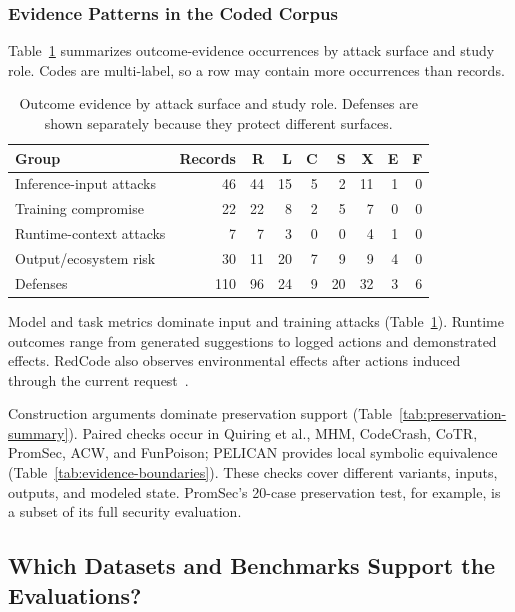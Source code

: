 \documentclass[acmsmall,screen,review,nonacm]{acmart}
\begin{document}
\subsubsection{Evidence Patterns in the Coded Corpus}
Table~\ref{tab:surface-evidence} summarizes outcome-evidence occurrences by attack surface and study role. Codes are multi-label, so a row may contain more occurrences than records.

{\scriptsize
\begin{table}[t]
\centering
\caption{Outcome evidence by attack surface and study role. Defenses are shown separately because they protect different surfaces.}
\label{tab:surface-evidence}
\begin{tabular}{@{}lrrrrrrrr@{}}
\toprule
\textbf{Group} & \textbf{Records} & \textbf{R} & \textbf{L} & \textbf{C} & \textbf{S} & \textbf{X} & \textbf{E} & \textbf{F} \\
\midrule
Inference-input attacks & 46 & 44 & 15 & 5 & 2 & 11 & 1 & 0 \\
Training compromise & 22 & 22 & 8 & 2 & 5 & 7 & 0 & 0 \\
Runtime-context attacks & 7 & 7 & 3 & 0 & 0 & 4 & 1 & 0 \\
Output/ecosystem risk & 30 & 11 & 20 & 7 & 9 & 9 & 4 & 0 \\
Defenses & 110 & 96 & 24 & 9 & 20 & 32 & 3 & 6 \\
\bottomrule
\end{tabular}
\end{table}
}

Model and task metrics dominate input and training attacks (Table~\ref{tab:surface-evidence}). Runtime outcomes range from generated suggestions to logged actions and demonstrated effects. RedCode also observes environmental effects after actions induced through the current request~\cite{redcode2024}.

Construction arguments dominate preservation support (Table~\ref{tab:preservation-summary}). Paired checks occur in Quiring et al., MHM, CodeCrash, CoTR, PromSec, ACW, and FunPoison; PELICAN provides local symbolic equivalence (Table~\ref{tab:evidence-boundaries}). These checks cover different variants, inputs, outputs, and modeled state. PromSec's 20-case preservation test, for example, is a subset of its full security evaluation.

\FloatBarrier
\subsection{Which Datasets and Benchmarks Support the Evaluations?}
\end{document}
